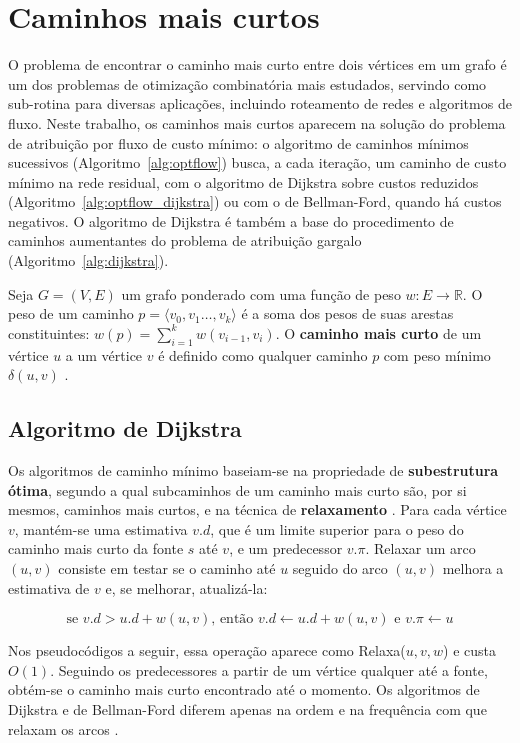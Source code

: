 \section{Caminhos mais curtos}

O problema de encontrar o caminho mais curto entre dois vértices em um grafo é um dos problemas de otimização combinatória mais estudados, servindo como sub-rotina para diversas aplicações, incluindo roteamento de redes e algoritmos de fluxo. Neste trabalho, os caminhos mais curtos aparecem na solução do problema de atribuição por fluxo de custo mínimo: o algoritmo de caminhos mínimos sucessivos (Algoritmo~\ref{alg:optflow}) busca, a cada iteração, um caminho de custo mínimo na rede residual, com o algoritmo de Dijkstra sobre custos reduzidos (Algoritmo~\ref{alg:optflow_dijkstra}) ou com o de Bellman-Ford, quando há custos negativos. O algoritmo de Dijkstra é também a base do procedimento de caminhos aumentantes do problema de atribuição gargalo (Algoritmo~\ref{alg:dijkstra}).

Seja $G=(V,E)$ um grafo ponderado com uma função de peso $w : E \rightarrow \mathbb{R}$. O peso de um caminho $p = \langle v_0, v_1 \dots, v_k \rangle$ é a soma dos pesos de suas arestas constituintes: $w(p) = \sum_{i=1}^{k}w(v_{i-1},v_i)$. O \textbf{caminho mais curto} de um vértice $u$ a um vértice $v$ é definido como qualquer caminho $p$ com peso mínimo $\delta(u,v)$ \cite{cormen}.

\subsection{Algoritmo de Dijkstra}

Os algoritmos de caminho mínimo baseiam-se na propriedade de \textbf{subestrutura ótima}, segundo a qual subcaminhos de um caminho mais curto são, por si mesmos, caminhos mais curtos, e na técnica de \textbf{relaxamento} \cite{kleinberg}. Para cada vértice $v$, mantém-se uma estimativa $v.d$, que é um limite superior para o peso do caminho mais curto da fonte $s$ até $v$, e um predecessor $v.\pi$. Relaxar um arco $(u,v)$ consiste em testar se o caminho até $u$ seguido do arco $(u,v)$ melhora a estimativa de $v$ e, se melhorar, atualizá-la:

\begin{equation}
    \text{se } v.d > u.d + w(u,v)\text{, então } v.d \leftarrow u.d + w(u,v) \text{ e } v.\pi \leftarrow u
    \label{eq:relax}
\end{equation}

Nos pseudocódigos a seguir, essa operação aparece como Relaxa($u, v, w$) e custa $O(1)$. Seguindo os predecessores a partir de um vértice qualquer até a fonte, obtém-se o caminho mais curto encontrado até o momento. Os algoritmos de Dijkstra e de Bellman-Ford diferem apenas na ordem e na frequência com que relaxam os arcos \cite{cormen}.


